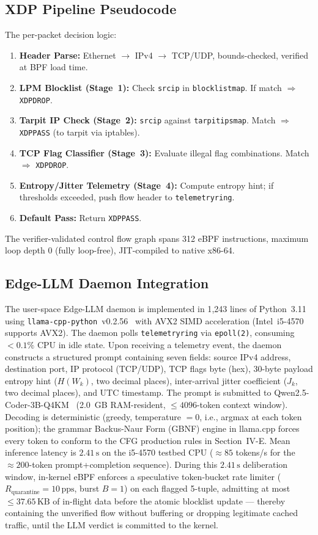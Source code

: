 \documentclass[journal]{IEEEtran}
\renewcommand{\_}{\textunderscore\allowbreak}
\begin{document}
\subsection{XDP Pipeline Pseudocode}
The per-packet decision logic:
\begin{enumerate}\setlength{\itemsep}{0pt}
  \item \textbf{Header Parse:} Ethernet $\to$ IPv4 $\to$ TCP/UDP, bounds-checked,
    verified at BPF load time.
  \item \textbf{LPM Blocklist (Stage~1):} Check \texttt{src\_ip} in
    \texttt{blocklist\_map}. If match $\Rightarrow$ \texttt{XDP\_DROP}.
  \item \textbf{Tarpit IP Check (Stage~2):} \texttt{src\_ip} against
    \texttt{tarpit\_ips\_map}. Match $\Rightarrow$ \texttt{XDP\_PASS} (to tarpit
    via iptables).
  \item \textbf{TCP Flag Classifier (Stage~3):} Evaluate illegal flag combinations.
    Match $\Rightarrow$ \texttt{XDP\_DROP}.
  \item \textbf{Entropy/Jitter Telemetry (Stage~4):} Compute entropy hint; if
    thresholds exceeded, push flow header to \texttt{telemetry\_ring}.
  \item \textbf{Default Pass:} Return \texttt{XDP\_PASS}.
\end{enumerate}
The verifier-validated control flow graph spans 312 eBPF instructions, maximum
loop depth 0 (fully loop-free), JIT-compiled to native x86-64.

\subsection{Edge-LLM Daemon Integration}
The user-space Edge-LLM daemon is implemented in 1{,}243 lines of Python~3.11
using \texttt{llama-cpp-python}~v0.2.56~\cite{llamacpp2024} with AVX2 SIMD
acceleration (Intel~i5-4570 supports AVX2). The daemon polls
\texttt{telemetry\_ring} via \texttt{epoll(2)}, consuming $< 0.1\%$ CPU in
idle state. Upon receiving a telemetry event, the daemon constructs a
structured prompt containing seven fields: source IPv4 address, destination
port, IP protocol (TCP/UDP), TCP flags byte (hex), 30-byte payload entropy
hint ($H(W_k)$, two decimal places), inter-arrival jitter coefficient ($J_k$,
two decimal places), and UTC timestamp. The prompt is submitted to
Qwen2.5-Coder-3B-Q4\_K\_M~\cite{qwen2024qwen25coder} (2.0~GB RAM-resident,
$\le 4096$-token context window). Decoding is deterministic (greedy,
temperature $= 0$, i.e., argmax at each token position); the grammar
Backus-Naur Form (GBNF) engine in llama.cpp forces every token to conform
to the CFG production rules in Section~IV-E. Mean inference latency is $2.41\,\text{s}$ on the i5-4570 testbed CPU (${\approx}85$ tokens/s for
the ${\approx}200$-token prompt+completion sequence). During this $2.41\,\text{s}$ deliberation
window, in-kernel eBPF enforces a speculative token-bucket rate limiter ($R_{\text{quarantine}} = 10\,\text{pps}$,
burst $B = 1$) on each flagged 5-tuple, admitting at most $\le 37.65\,\text{KB}$ of in-flight data
before the atomic blocklist update --- thereby containing the unverified flow without buffering or
dropping legitimate cached traffic, until the LLM verdict is committed to the kernel.
\end{document}
